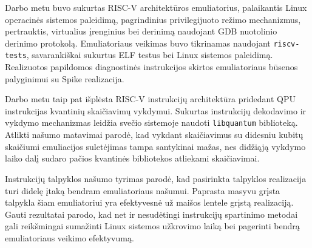 \documentclass[]{VUMIFTemplateClass}
\begin{document}
\onehalfspacing











Darbo metu buvo sukurtas RISC-V architektūros emuliatorius, palaikantis Linux operacinės sistemos paleidimą, pagrindinius privilegijuoto režimo mechanizmus, pertrauktis, virtualius įrenginius bei derinimą naudojant GDB nuotolinio derinimo protokolą. Emuliatoriaus veikimas buvo tikrinamas naudojant \texttt{riscv-tests}, savarankiškai sukurtus ELF testus bei Linux sistemos paleidimą. Realizuotos papildomos diagnostinės instrukcijos skirtos emuliatoriaus būsenos palyginimui su Spike realizacija.

Darbo metu taip pat išplėsta RISC-V instrukcijų architektūra pridedant QPU instrukcijas kvantinių skaičiavimų vykdymui. Sukurtas instrukcijų dekodavimo ir vykdymo mechanizmas leidžia svečio sistemoje naudoti \texttt{libquantum} biblioteką. Atlikti našumo matavimai parodė, kad vykdant skaičiavimus su didesniu kubitų skaičiumi emuliacijos suletėjimas tampa santykinai mažas, nes didžiąją vykdymo laiko dalį sudaro pačios kvantinės bibliotekos atliekami skaičiavimai.

Instrukcijų talpyklos našumo tyrimas parodė, kad pasirinkta talpyklos realizacija turi didelę įtaką bendram emuliatoriaus našumui. Paprasta masyvu grįsta talpykla šiam emuliatoriui yra efektyvesnė už maišos lentele grįstą realizaciją. Gauti rezultatai parodo, kad net ir nesudėtingi instrukcijų spartinimo metodai gali reikšmingai sumažinti Linux sistemos užkrovimo laiką bei pagerinti bendrą emuliatoriaus veikimo efektyvumą.

\printbibliography[heading=bibintoc]

\appendix

\end{document}
